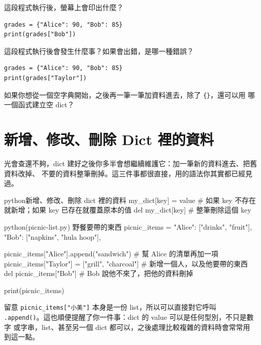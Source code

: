 \begin{drills}[label=drills:dict-basics]
\item 這段程式執行後，螢幕上會印出什麼？
\begin{verbatim}
grades = {"Alice": 90, "Bob": 85}
print(grades["Bob"])
\end{verbatim}
\item 這段程式執行後會發生什麼事？如果會出錯，是哪一種錯誤？
\begin{verbatim}
grades = {"Alice": 90, "Bob": 85}
print(grades["Taylor"])
\end{verbatim}
\item 如果你想從一個空字典開始，之後再一筆一筆加資料進去，除了 \texttt{\{\}}，還可以用
哪一個函式建立空 dict？
\end{drills}

\section{新增、修改、刪除 Dict 裡的資料}
\label{sec:dict-modify}

光會查還不夠，dict 建好之後你多半會想繼續維護它：加一筆新的資料進去、把舊資料改掉、
不要的資料整筆刪掉。這三件事都很直接，用的語法你其實都已經見過。

\begin{code}{python}{新增、修改、刪除 dict 裡的資料}
my_dict[key] = value   # 如果 key 不存在就新增；如果 key 已存在就覆蓋原本的值
del my_dict[key]       # 整筆刪除這個 key
\end{code}

\begin{example}{python}{(picnic-list.py) 野餐要帶的東西}
picnic_items = {
    "Alice": ["drinks", "fruit"],
    "Bob": ["napkins", "hula hoop"],
}

picnic_items["Alice"].append("sandwich")   # 幫 Alice 的清單再加一項
picnic_items["Taylor"] = ["grill", "charcoal"]  # 新增一個人，以及他要帶的東西
del picnic_items["Bob"]                  # Bob 說他不來了，把他的資料刪掉

print(picnic_items)
\end{example}


留意 \texttt{picnic\_items["小美"]} 本身是一份 list，所以可以直接對它呼叫
\texttt{.append()}。這也順便提醒了你一件事：dict 的 value 可以是任何型別，不只是數字
或字串，list、甚至另一個 dict 都可以，之後處理比較複雜的資料時會常常用到這一點。

